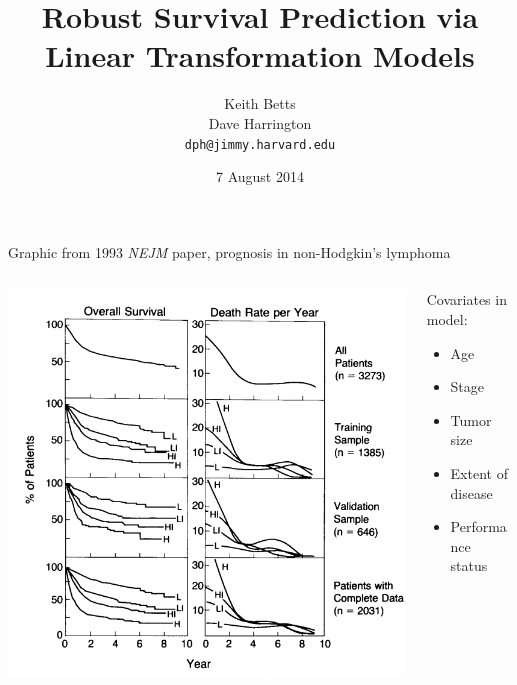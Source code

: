 \documentclass[11pt]{beamer}
\title[Predicting survival]%
{Robust Survival Prediction via Linear Transformation Models}
\author[Betts, Harrington]{Keith Betts \\
Dave Harrington \\
 \texttt{dph@jimmy.harvard.edu} }
\institute %
[AG, Harvard] {{\color{brick} Analysis Group, Harvard University}}
\date{7 August 2014}
\begin{document}
\begin{frame}

\titlepage

\end{frame}


\begin{frame}{Graphic from 1993 \textsl{NEJM} paper, prognosis in
non-Hodgkin's lymphoma}


\begin{columns}[c]

\begin{column}{0.65\textwidth}


\begin{center}
\includegraphics[width=1.0\textwidth]{./figures/nejm_curves.pdf}
\end{center}

\end{column}


\begin{column}{0.35\textwidth}

Covariates in model: 
\begin{itemize}

  \item Age

  \item Stage

  \item Tumor size

  \item Extent of disease

  \item Performance status

\end{itemize}
\end{column}


\end{columns}

\end{frame}
\end{document}
